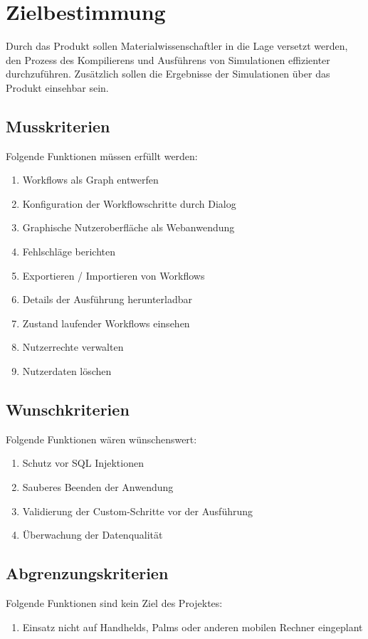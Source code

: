 \chapter{Zielbestimmung}
Durch das Produkt sollen Materialwissenschaftler in die Lage versetzt werden, den Prozess des Kompilierens und Ausführens von Simulationen effizienter durchzuführen. 
Zusätzlich sollen die Ergebnisse der Simulationen über das Produkt einsehbar sein. \newline
\section{Musskriterien}
Folgende Funktionen müssen erfüllt werden:
\renewcommand{\labelenumi}{/M\arabic{enumi}0/}
\begin{enumerate}
    \setlength\itemsep{-1em}
    \item Workflows als Graph entwerfen
    \item Konfiguration der Workflowschritte durch Dialog
    \item Graphische Nutzeroberfläche als Webanwendung
    \item Fehlschläge berichten
    \item Exportieren / Importieren von Workflows
    \item Details der Ausführung herunterladbar
    \item Zustand laufender Workflows einsehen
    \item Nutzerrechte verwalten
    \item Nutzerdaten löschen
\end{enumerate}
\newpage
\section{Wunschkriterien}
Folgende Funktionen wären wünschenswert:
\renewcommand{\labelenumi}{/W\arabic{enumi}0/}
\begin{enumerate}
    \setlength\itemsep{-1em}
    \item Schutz vor SQL Injektionen
    \item Sauberes Beenden der Anwendung
    \item Validierung der Custom-Schritte vor der Ausführung
    \item Überwachung der Datenqualität
\end{enumerate}

\section{Abgrenzungskriterien}
Folgende Funktionen sind kein Ziel des Projektes:
\renewcommand{\labelenumi}{/A\arabic{enumi}0/}
\begin{enumerate}
    \setlength\itemsep{-1em}
    \item Einsatz nicht auf Handhelds, Palms oder anderen mobilen Rechner eingeplant 
\end{enumerate}
\renewcommand{\labelenumi}{\arabic{enumi}}